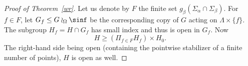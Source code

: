 \begin{proof}[Proof of Theorem~\ref{wr}]
Let us denote by $F$ the finite set $g_\beta(\Sigma_\alpha\cap\Sigma_\beta)$. For $f\in F$, let $G_f\leq G\wr_\Omega\sinf$ be the corresponding copy of $G$ acting on $\Lambda\times\{f\}$. The subgroup $H_f=H\cap G_f$ has small index and thus is open in $G_f$. Now
\[
H\geq\left(\Pi_{f\in F}H_f\right)\times H_0.
\]
The right-hand side being open (containing the pointwise stabilizer of a finite number of points), $H$ is open as well.
\end{proof}
